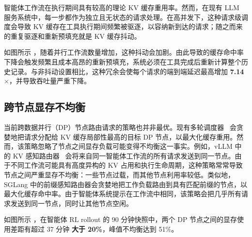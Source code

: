 智能体工作流在执行期间具有较高的理论 KV 缓存重用率。然而，在现有 LLM 服务系统中，每一步都作为独立且无状态的请求处理。在高并发下，这种请求级调度会导致 KV 缓存在工具执行期间频繁被驱逐，以容纳新到达的请求；随之而来的重复驱逐和重新预填充就是 KV 缓存抖动。


如图所示 ，随着并行工作流数量增加，这种抖动会加剧。由此导致的缓存命中率下降会触发频繁且成本高昂的重新预填充，系统必须在工具完成后重新计算整个历史记录。与非抖动设置相比，这种冗余会使每个请求的端到端延迟最高增加 \textbf{7.14$\times$}，并导致吞吐量严重下降。

\vspace{-2mm}
\subsection{跨节点显存不均衡}
\label{sec:cross node imbalance}
当前跨数据并行（DP）节点路由请求的策略也并非最优。现有多轮调度器~\citep{zheng2024sglangefficientexecutionstructured, vllm_kvaware_routing} 会贪婪地把请求分配给 KV 缓存局部性最高的目标 DP 节点，以最大化缓存重用。然而，该策略忽略了节点之间显存负载可能变得不均衡这一事实。例如，vLLM 中的 KV 感知路由器~\citep{vllm_kvaware_routing} 会将来自同一智能体工作流的所有请求发送到同一节点。由于不同工作流可能具有高度异构的 KV 占用和执行生命周期，这种策略常常导致节点之间严重显存不均衡：一些节点过载，而其他节点利用率较低。类似地，SGLang 中的前缀感知路由器会贪婪地把工作负载路由到具有匹配前缀的节点，以最大化缓存命中率。由于智能体系统提示在工作流中相同，该策略会把几乎所有请求发送到同一节点，同时让其他节点空闲。


如图所示 ，在智能体 RL rollout 的 90 分钟快照中，两个 DP 节点之间的显存使用差距有超过 37 分钟 \textbf{大于 20\%}，峰值不均衡达到 51\%。

